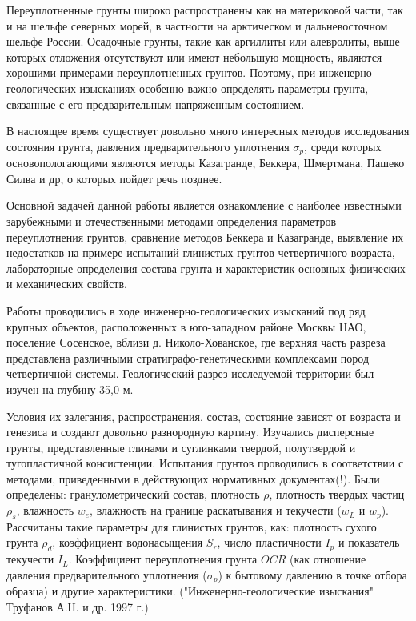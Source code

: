 Переуплотненные грунты широко распространены как на материковой части, так и на шельфе северных морей, в частности на арктическом и дальневосточном шельфе России.
 Осадочные грунты, такие как аргиллиты или алевролиты, выше которых отложения отсутствуют или имеют небольшую мощность, являются хорошими примерами переуплотненных грунтов.
  Поэтому, при инженерно-геологических изысканиях особенно важно определять параметры грунта, связанные с его предварительным напряженным состоянием.


В настоящее время существует довольно много интересных методов исследования  состояния грунта, давления предварительного уплотнения $\sigma_p$, среди которых основопологающими являются методы Казагранде, Беккера, Шмертмана, Пашеко Силва и др, о которых пойдет речь позднее. 

Основной задачей данной работы является ознакомление с наиболее известными зарубежными и отечественными методами определения параметров переуплотнения грунтов, сравнение методов Беккера и Казагранде, выявление их недостатков на примере испытаний глинистых грунтов четвертичного возраста, лабораторные определения состава грунта и характеристик основных физических и механических свойств. 
 
Работы проводились в ходе инженерно-геологических изысканий под ряд крупных объектов, расположенных в юго-западном районе Москвы НАО, поселение Сосенское, вблизи д. Николо-Хованское, где верхняя часть разреза представлена различными стратиграфо-генетическими комплексами пород четвертичной системы. Геологический разрез исследуемой территории был изучен на глубину 35,0 м.

Условия их залегания, распространения, состав, состояние зависят от возраста и генезиса и создают довольно разнородную картину. Изучались дисперсные грунты, представленные глинами и суглинками твердой, полутвердой и тугопластичной консистенции. Испытания грунтов проводились в соответствии с методами, приведенными в действующих нормативных документах(!). Были определены: гранулометрический состав, плотность $\rho$, плотность твердых частиц $\rho_s$, влажность $w_e$, влажность на границе раскатывания и текучести ($w_L$ и $w_p$). Рассчитаны такие параметры для глинистых грунтов, как: плотность сухого грунта $\rho_d$,  коэффициент водонасыщения $S_r$, число пластичности $I_p$ и показатель текучести $I_L$. Коэффициент переуплотнения грунта $OCR$ (как отношение давления предварительного уплотнения ($\sigma_p$) к бытовому давлению в точке отбора образца) и другие характеристики. ("Инженерно-геологические изыскания" Труфанов А.Н. и др. 1997 г.)